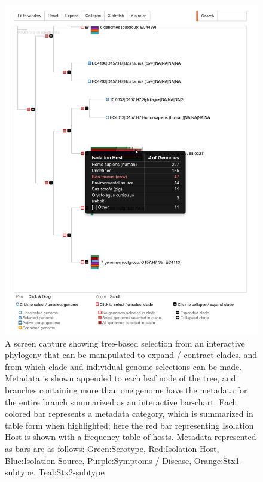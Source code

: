\documentclass[doublespacing, linenumbers]{bmcart}
\begin{document}
\begin{backmatter}
\newpage
\begin{figure}[h!]
   \includegraphics[width=1\columnwidth]{images/metadata_tree.png}
     \caption{A screen capture showing tree-based selection from an interactive phylogeny that can be manipulated to expand / contract clades, and from which clade and individual genome selections can be made. Metadata is shown appended to each leaf node of the tree, and branches containing more than one genome have the metadata for the entire branch summarized as an interactive bar-chart. Each colored bar represents a metadata category, which is summarized in table form when highlighted; here the red bar representing Isolation Host is shown with a frequency table of hosts. Metadata represented as bars are as follows: Green:Serotype, Red:Isolation Host, Blue:Isolation Source, Purple:Symptoms / Disease, Orange:Stx1-subtype, Teal:Stx2-subtype}
   \label{fig:tree_metadata}
\end{figure}


\end{backmatter}
\end{document}

